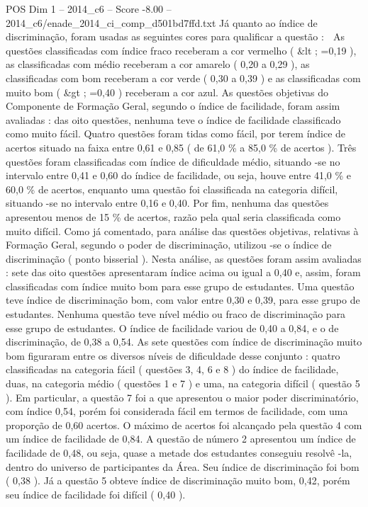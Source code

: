 \begin{textsample}{POS Dim 1 – 2014\_c6 – Score -8.00 – 2014\_c6/enade\_2014\_ci\_comp\_d501bd7ffd.txt}
Já quanto ao índice de discriminação, foram usadas as seguintes cores para qualificar a questão :  As questões classificadas com índice fraco receberam a cor vermelho ( \&lt ; =0,19 ), as classificadas com médio receberam a cor amarelo ( 0,20 a 0,29 ), as classificadas com bom receberam a cor verde ( 0,30 a 0,39 ) e as classificadas com muito bom ( \&gt ; =0,40 ) receberam a cor azul.
As questões objetivas do Componente de Formação Geral, segundo o índice de facilidade, foram assim avaliadas : das oito questões, nenhuma teve o índice de facilidade classificado como muito fácil.
Quatro questões foram tidas como fácil, por terem índice de acertos situado na faixa entre 0,61 e 0,85 ( de 61,0 \% a 85,0 \% de acertos ).
Três questões foram classificadas com índice de dificuldade médio, situando -se no intervalo entre 0,41 e 0,60 do índice de facilidade, ou seja, houve entre 41,0 \% e 60,0 \% de acertos, enquanto uma questão foi classificada na categoria difícil, situando -se no intervalo entre 0,16 e 0,40.
Por fim, nenhuma das questões apresentou menos de 15 \% de acertos, razão pela qual seria classificada como muito difícil.
Como já comentado, para análise das questões objetivas, relativas à Formação Geral, segundo o poder de discriminação, utilizou -se o índice de discriminação ( ponto bisserial ).
Nesta análise, as questões foram assim avaliadas : sete das oito questões apresentaram índice acima ou igual a 0,40 e, assim, foram classificadas com índice muito bom para esse grupo de estudantes.
Uma questão teve índice de discriminação bom, com valor entre 0,30 e 0,39, para esse grupo de estudantes.
Nenhuma questão teve nível médio ou fraco de discriminação para esse grupo de estudantes.
O índice de facilidade variou de 0,40 a 0,84, e o de discriminação, de 0,38 a 0,54.
As sete questões com índice de discriminação muito bom figuraram entre os diversos níveis de dificuldade desse conjunto : quatro classificadas na categoria fácil ( questões 3, 4, 6 e 8 ) do índice de facilidade, duas, na categoria médio ( questões 1 e 7 ) e uma, na categoria difícil ( questão 5 ).
Em particular, a questão 7 foi a que apresentou o maior poder discriminatório, com índice 0,54, porém foi considerada fácil em termos de facilidade, com uma proporção de 0,60 acertos.
O máximo de acertos foi alcançado pela questão 4 com um índice de facilidade de 0,84.
A questão de número 2 apresentou um índice de facilidade de 0,48, ou seja, quase a metade dos estudantes conseguiu resolvê -la, dentro do universo de participantes da Área.
Seu índice de discriminação foi bom ( 0,38 ).
Já a questão 5 obteve índice de discriminação muito bom, 0,42, porém seu índice de facilidade foi difícil ( 0,40 ).

\end{textsample}
